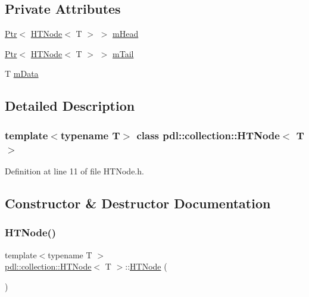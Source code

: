 \subsection*{Private Attributes}
\begin{DoxyCompactItemize}
\item 
\mbox{\hyperlink{classpdl_1_1memory_1_1_ptr}{Ptr}}$<$ \mbox{\hyperlink{classpdl_1_1collection_1_1_h_t_node}{H\+T\+Node}}$<$ T $>$ $>$ \mbox{\hyperlink{classpdl_1_1collection_1_1_h_t_node_a10f7c41866b1d09722e319c3ca740f00}{m\+Head}}
\item 
\mbox{\hyperlink{classpdl_1_1memory_1_1_ptr}{Ptr}}$<$ \mbox{\hyperlink{classpdl_1_1collection_1_1_h_t_node}{H\+T\+Node}}$<$ T $>$ $>$ \mbox{\hyperlink{classpdl_1_1collection_1_1_h_t_node_acbf167f6ff62c765bd4c6dd329a6c8c3}{m\+Tail}}
\item 
T \mbox{\hyperlink{classpdl_1_1collection_1_1_h_t_node_aeeb7d44e63df87d297b809bd462f7e78}{m\+Data}}
\end{DoxyCompactItemize}


\subsection{Detailed Description}
\subsubsection*{template$<$typename T$>$\newline
class pdl\+::collection\+::\+H\+T\+Node$<$ T $>$}



Definition at line 11 of file H\+T\+Node.\+h.



\subsection{Constructor \& Destructor Documentation}
\mbox{\label{classpdl_1_1collection_1_1_h_t_node_a2265e71e885e3589270255409c6e6ddc}} 
\subsubsection{\texorpdfstring{HTNode()}{HTNode()}\hspace{0.1cm}{\footnotesize\ttfamily [1/2]}}
{\footnotesize\ttfamily template$<$typename T $>$ \\
\mbox{\hyperlink{classpdl_1_1collection_1_1_h_t_node}{pdl\+::collection\+::\+H\+T\+Node}}$<$ T $>$\+::\mbox{\hyperlink{classpdl_1_1collection_1_1_h_t_node}{H\+T\+Node}} (\begin{DoxyParamCaption}{ }\end{DoxyParamCaption})\hspace{0.3cm}{\ttfamily [inline]}}



